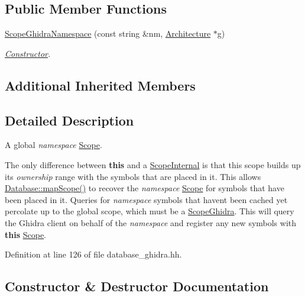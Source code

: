 \subsection*{Public Member Functions}
\begin{DoxyCompactItemize}
\item 
\mbox{\hyperlink{class_scope_ghidra_namespace_a22ca009386dd9d33a3e9572f5cd8d3f9}{Scope\+Ghidra\+Namespace}} (const string \&nm, \mbox{\hyperlink{class_architecture}{Architecture}} $\ast$g)
\begin{DoxyCompactList}\small\item\em \mbox{\hyperlink{class_constructor}{Constructor}}. \end{DoxyCompactList}\end{DoxyCompactItemize}
\subsection*{Additional Inherited Members}


\subsection{Detailed Description}
A global {\itshape namespace} \mbox{\hyperlink{class_scope}{Scope}}. 

The only difference between {\bfseries{this}} and a \mbox{\hyperlink{class_scope_internal}{Scope\+Internal}} is that this scope builds up its {\itshape ownership} range with the symbols that are placed in it. This allows \mbox{\hyperlink{class_database_ab3840564f424238dd3a498fdb1a02644}{Database\+::map\+Scope()}} to recover the {\itshape namespace} \mbox{\hyperlink{class_scope}{Scope}} for symbols that have been placed in it. Queries for {\itshape namespace} symbols that haven\textquotesingle{}t been cached yet percolate up to the global scope, which must be a \mbox{\hyperlink{class_scope_ghidra}{Scope\+Ghidra}}. This will query the Ghidra client on behalf of the {\itshape namespace} and register any new symbols with {\bfseries{this}} \mbox{\hyperlink{class_scope}{Scope}}. 

Definition at line 126 of file database\+\_\+ghidra.\+hh.



\subsection{Constructor \& Destructor Documentation}
\mbox{\label{class_scope_ghidra_namespace_a22ca009386dd9d33a3e9572f5cd8d3f9}} 
